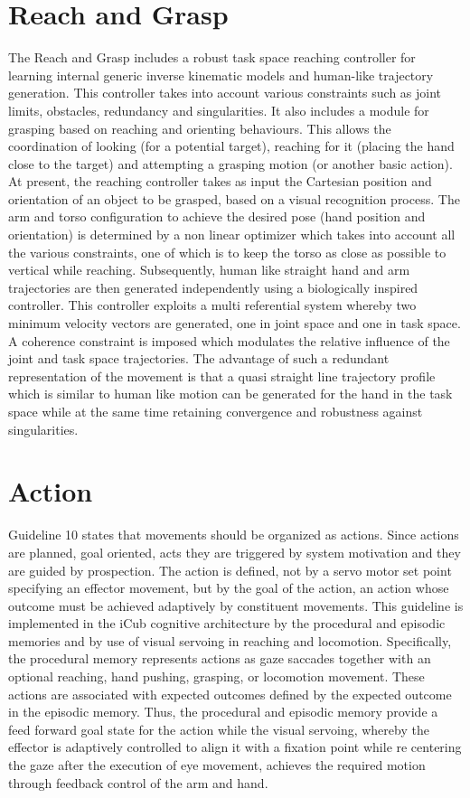 \documentclass[a4paper, 12pt]{report}
\begin{document}
\section{Reach and Grasp}
The Reach and Grasp includes a robust task space reaching controller 
for learning internal generic inverse kinematic models and human-like 
trajectory generation. This controller takes into account various constraints 
such as joint limits, obstacles, redundancy and singularities. It also includes 
a module for grasping based on reaching and orienting behaviours. This allows 
the coordination of looking (for a potential target), reaching for it (placing 
the hand close to the target) and attempting a grasping motion (or another 
basic action).
At present, the reaching controller takes as input the Cartesian position and 
orientation of an object to be grasped, based on a visual recognition 
process. The arm and torso configuration to achieve the desired pose (hand 
position and orientation) is determined by a non linear optimizer 
which takes into account all the various constraints, one of which is to keep 
the torso as close as possible to vertical while reaching. Subsequently, 
human like straight hand and arm trajectories are then generated 
independently using a biologically inspired controller.\textbf{\cite{lorenzo}} 
This 
controller 
exploits a multi referential system whereby two minimum velocity
vectors are generated, one in joint space and one in task space. A 
coherence constraint is imposed which modulates the relative influence of the 
joint and task space trajectories. The advantage of such a redundant 
representation of the movement is that a quasi straight line trajectory 
profile which is similar to human like motion can be generated for the hand in 
the task space while at the same time retaining convergence and robustness 
against singularities.
\section{Action}
Guideline 10 states that movements should be organized as actions. Since 
actions are planned, goal oriented, acts they are triggered by system 
motivation and they are guided by prospection. The action is defined, not by a 
servo motor set point specifying an effector movement, but by the goal of the 
action, an action whose outcome must be achieved adaptively by constituent 
movements. This guideline is implemented in the iCub cognitive architecture by 
the procedural and episodic memories and by use of visual servoing in reaching 
and locomotion\textbf{\cite{xavier}}. Specifically, the procedural memory 
represents 
actions as gaze 
saccades together with an optional reaching, hand pushing, grasping, or 
locomotion movement. These actions are associated with expected outcomes 
defined by the expected outcome in the episodic memory. Thus, the procedural 
and episodic memory provide a feed forward goal state for the action while the 
visual servoing, whereby the effector is adaptively controlled to align it with 
a fixation point while re centering the gaze after the execution of eye 
movement, achieves the required motion through feedback control of the arm and 
hand.
\newpage
\end{document}

